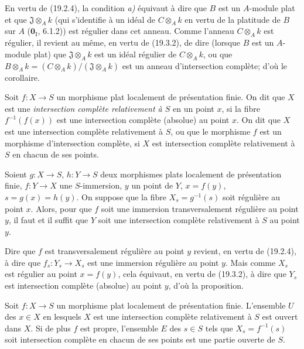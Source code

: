 
En vertu de (19.2.4), la condition \emph{a)} équivaut à dire que $B$ est un $A$-module plat et que $\mathfrak J\otimes_A k$ (qui s'identifie à un idéal de $C\otimes_A k$ en vertu de la platitude de $B$ sur $A$ ($\mathbf{0}_{\mathrm I}$, 6.1.2)) est régulier dans cet anneau. Comme l'anneau $C\otimes_A k$ est régulier, il revient au même, en vertu de (19.3.2), de dire (lorsque $B$ est un $A$-module plat) que $\mathfrak J\otimes_A k$ est un idéal régulier de $C\otimes_A k$, ou que $B\otimes_A k=(C\otimes_A k)/(\mathfrak J\otimes_A k)$ est un anneau d'intersection complète; d'où le corollaire.

\begin{definition}[19.3.6]
Soit $f:X\to S$ un morphisme \textup{plat} localement de présentation finie. On dit que $X$ est une \emph{intersection complète relativement à $S$} en un point $x$, si la fibre $f^{-1}(f(x))$ est une intersection complète (absolue) au point $x$. On dit que $X$ est une intersection complète relativement à $S$, ou que le morphisme $f$ est un morphisme d'intersection complète, si $X$ est intersection complète relativement à $S$ en chacun de ses points.
\end{definition}

\begin{proposition}[19.3.7]
\label{IV.19.3.7}
Soient $g:X\to S$, $h:Y\to S$ deux morphismes plats localement de présentation finie, $f:Y\to X$ une $S$-immersion, $y$ un point de $Y$, $x=f(y)$, $s=g(x)=h(y)$. On suppose que la fibre $X_s=g^{-1}(s)$ soit régulière au point $x$. Alors, pour que $f$ soit une immersion transversalement régulière au point $y$, il faut et il suffit que $Y$ soit une intersection complète relativement à $S$ au point $y$.
\end{proposition}

Dire que $f$ est transversalement régulière au point $y$ revient, en vertu de (19.2.4), à dire que $f_s:Y_s\to X_s$ est une immersion régulière au point $y$. Mais comme $X_s$ est régulier au point $x=f(y)$, cela équivaut, en vertu de (19.3.2), à dire que $Y_s$ est intersection complète (absolue) au point $y$, d'où la proposition.

\begin{corollary}[19.3.8]
\label{IV.19.3.8}
Soit $f:X\to S$ un morphisme plat localement de présentation finie. L'ensemble $U$ des $x\in X$ en lesquels $X$ est une intersection complète relativement à $S$ est ouvert dans $X$. Si de plus $f$ est propre, l'ensemble $E$ des $s\in S$ tels que $X_s=f^{-1}(s)$ soit intersection complète en chacun de ses points est une partie ouverte de $S$.
\end{corollary}

